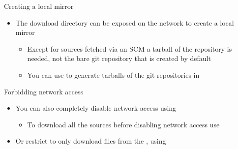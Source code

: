 \begin{frame}{Creating a local mirror}
  \begin{itemize}
    \item The download directory can be exposed on the network to create a
      local mirror
      \begin{itemize}
        \item Except for sources fetched via an SCM a tarball of the
          repository is needed, not the bare git repository that is created
          by default
        \item You can use  to
          generate tarballs of the git repositories in 
      \end{itemize}
  \end{itemize}
\end{frame}

\begin{frame}{Forbidding network access}
  \begin{itemize}
    \item You can also completely disable network access using
      \begin{itemize}
      \item To download all the sources before disabling network access use
      \end{itemize}
    \item Or restrict  to only download files from the
      , using 
  \end{itemize}
\end{frame}
